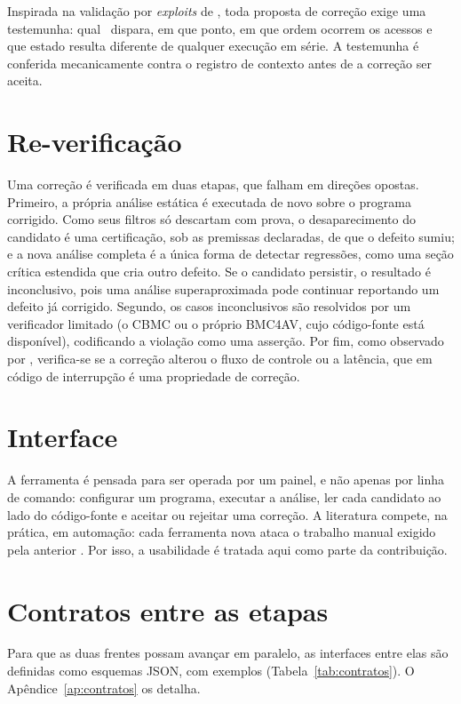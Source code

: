 Inspirada na validação por \textit{exploits} de , toda
proposta de correção exige uma testemunha: qual \isr\ dispara, em que
ponto, em que ordem ocorrem os acessos e que estado resulta diferente de
qualquer execução em série. A testemunha é conferida mecanicamente contra o
registro de contexto antes de a correção ser aceita.

\section{Re-verificação}
\label{sec:reverificacao}

Uma correção é verificada em duas etapas, que falham em direções opostas.
Primeiro, a própria análise estática é executada de novo sobre o programa
corrigido. Como seus filtros só descartam com prova, o desaparecimento do
candidato é uma certificação, sob as premissas declaradas, de que o defeito
sumiu; e a nova análise completa é a única forma de detectar
regressões, como uma seção crítica estendida que cria outro defeito.
Se o candidato persistir, o resultado é inconclusivo, pois uma análise
superaproximada pode continuar reportando um defeito já corrigido. Segundo, os
casos inconclusivos são resolvidos por um verificador limitado (o CBMC \cite{cbmc} ou o próprio BMC4AV, cujo código-fonte está disponível), codificando a violação como uma asserção. Por fim, como observado por
, verifica-se se a correção alterou o fluxo de controle ou
a latência, que em código de interrupção é uma propriedade de correção.

\section{Interface}
\label{sec:interface}

A ferramenta é pensada para ser operada por um painel, e não apenas por linha
de comando: configurar um programa, executar a análise, ler cada candidato ao
lado do código-fonte e aceitar ou rejeitar uma correção. A literatura compete,
na prática, em automação: cada ferramenta nova ataca o trabalho manual exigido pela anterior \cite{intrace,nichecker,bmc4av}. Por isso, a usabilidade é tratada aqui como parte da contribuição.

\section{Contratos entre as etapas}
\label{sec:contratos}

Para que as duas frentes possam avançar em paralelo, as interfaces entre elas
são definidas como esquemas JSON, com exemplos (Tabela~\ref{tab:contratos}).
\ifparcial\else O Apêndice~\ref{ap:contratos} os detalha.\fi

